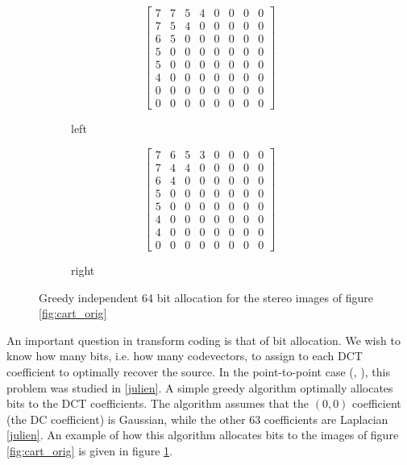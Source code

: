 \begin{figure}
    \begin{subfigure}{0.5\textwidth}
        \begin{equation*}
            \left[
            \begin{matrix}
                7 & 7 & 5 & 4 & 0 & 0 & 0 & 0 \\
                7 & 5 & 4 & 0 & 0 & 0 & 0 & 0 \\
                6 & 5 & 0 & 0 & 0 & 0 & 0 & 0 \\
                5 & 0 & 0 & 0 & 0 & 0 & 0 & 0 \\
                5 & 0 & 0 & 0 & 0 & 0 & 0 & 0 \\
                4 & 0 & 0 & 0 & 0 & 0 & 0 & 0 \\
                0 & 0 & 0 & 0 & 0 & 0 & 0 & 0 \\
                0 & 0 & 0 & 0 & 0 & 0 & 0 & 0
            \end{matrix}
            \right]
        \end{equation*}
    \caption{left}
    \end{subfigure}%
    \begin{subfigure}{0.5\textwidth}
        \begin{equation*}
            \left[
            \begin{matrix}
                7 & 6 & 5 & 3 & 0 & 0 & 0 & 0 \\
                7 & 4 & 4 & 0 & 0 & 0 & 0 & 0 \\
                6 & 4 & 0 & 0 & 0 & 0 & 0 & 0 \\
                5 & 0 & 0 & 0 & 0 & 0 & 0 & 0 \\
                5 & 0 & 0 & 0 & 0 & 0 & 0 & 0 \\
                4 & 0 & 0 & 0 & 0 & 0 & 0 & 0 \\
                4 & 0 & 0 & 0 & 0 & 0 & 0 & 0 \\
                0 & 0 & 0 & 0 & 0 & 0 & 0 & 0
            \end{matrix}
            \right]
        \end{equation*}
    \caption{right}
    \end{subfigure}
    \caption{Greedy independent 64 bit allocation for the stereo images of figure \ref{fig:cart_orig} }
    \label{fig:cart_bit_alloc}
\end{figure}

An important question in transform coding is that of bit allocation. We wish to know how many bits, i.e. how many codevectors, to assign to each DCT coefficient to optimally recover the source. In the point-to-point case (\sysIIN, \sysJJN), this problem was studied in \ref{julien}. A simple greedy algorithm optimally allocates bits to the DCT coefficients. The algorithm assumes that the $(0,0)$ coefficient (the DC coefficient) is Gaussian, while the other 63 coefficients are Laplacian \ref{julien}. An example of how this algorithm allocates bits to the images of figure \ref{fig:cart_orig} is given in figure \ref{fig:cart_bit_alloc}.

